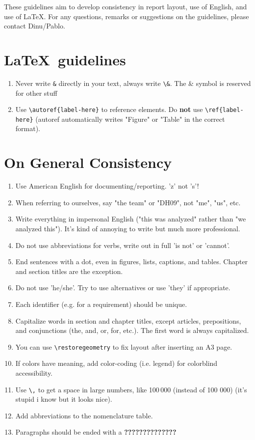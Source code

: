 \label{chapter:template-guidelines}
These guidelines aim to develop consistency in report layout, use of English, and use of \LaTeX. For any questions, remarks or suggestions on the guidelines, please contact Dinu/Pablo.

\section*{\LaTeX \ guidelines}
\begin{enumerate}[label=LTX.\arabic*]
    \item Never write \verb|&| directly in your text, always write \verb|\&|. The \& symbol is reserved for other stuff
    \item Use \verb|\autoref{label-here}| to reference elements. Do \textbf{not} use \verb|\ref{label-here}| (autoref automatically writes "Figure" or "Table" in the correct format).
\end{enumerate}
\section*{On General Consistency}
\label{sec:general-consistency}
\begin{enumerate}[label=G.\arabic*]
    \item Use American English for documenting/reporting. 'z' not 's'!
    \item When referring to ourselves, say "the team" or "DH09", not "me", "us", etc.
    \item Write everything in impersonal English ("this was analyzed" rather than "we analyzed this"). It's kind of annoying to write but much more professional.
    \item Do not use abbreviations for verbs, write out in full 'is not' or 'cannot'.
    \item End sentences with a dot, even in figures, lists, captions, and tables. Chapter and section titles are the exception.
    \item Do not use 'he/she'. Try to use alternatives or use 'they' if appropriate.
    \item Each identifier (e.g. for a requirement) should be unique. %
    \item Capitalize words in section and chapter titles, except articles, prepositions, and conjunctions (the, and, or, for, etc.). The first word is always capitalized.
    \item You can use \verb|\restoregeometry| to fix layout after inserting an A3 page.
    \item If colors have meaning, add color-coding (i.e. legend) for colorblind accessibility.
    \item Use \verb|\,| to get a space in large numbers, like 100\,000 (instead of 100 000) (it's stupid i know but it looks nice).
    \item Add abbreviations to the nomenclature table. 
    \item Paragraphs should be ended with a \textbf{??????????????} 
\end{enumerate}
